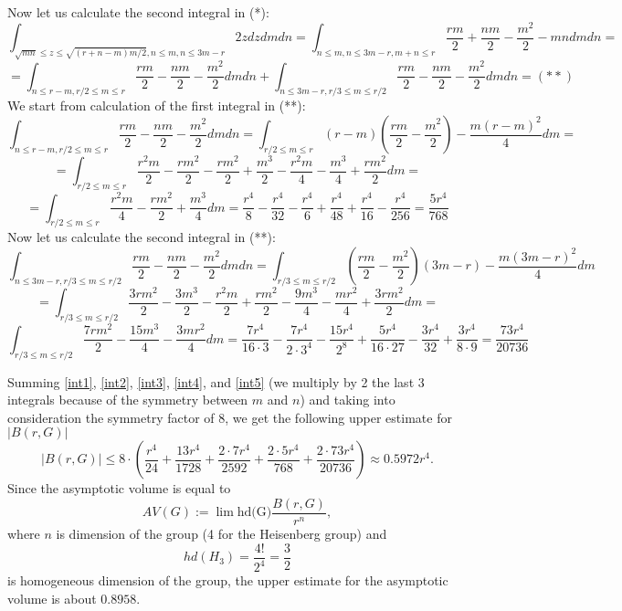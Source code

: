 \documentclass[11pt]{article}
\theoremstyle{Mystyle}
\begin{document}
Now let us calculate the second integral in (*):
$$\int_{\sqrt{mn}\leq z\leq \sqrt{(r+n-m)m/2}, n\leq m, n\leq 3m - r} 2z dz dm dn= 
\int_{n\leq m, n\leq 3m - r, m+n\leq r} \frac{rm}{2} + \frac{nm}{2} - \frac{m^2}{2} - mn dm dn=
$$
$$=\int_{n\leq r-m, r/2\leq m\leq r} \frac{rm}{2} - \frac{nm}{2} - \frac{m^2}{2} dm dn + 
\int_{n\leq 3m - r, r/3\leq m\leq r/2} \frac{rm}{2} - \frac{nm}{2}-\frac{m^2}{2} dm dn = (**)$$
We start from calculation of the first integral in (**):
$$\int_{n\leq r-m, r/2\leq m\leq r} \frac{rm}{2} - \frac{nm}{2} - \frac{m^2}{2} dm dn = 
\int_{r/2\leq m\leq r} (r-m)\left(\frac{rm}{2} - \frac{m^2}{2}\right) - \frac{m(r-m)^2}{4} dm=$$
$$=\int_{r/2\leq m\leq r} \frac{r^2m}{2} - \frac{rm^2}{2} - \frac{rm^2}{2} + \frac{m^3}{2} - \frac{r^2m}{4} - \frac{m^3}{4} + \frac{rm^2}{2} dm=$$
\begin{equation}
\label{int4}
=\int_{r/2\leq m\leq r} \frac{r^2m}{4} - \frac{rm^2}{2} + \frac{m^3}{4} dm = 
\frac{r^4}{8} - \frac{r^4}{32} - \frac{r^4}{6} + \frac{r^4}{48} + \frac{r^4}{16} - \frac{r^4}{256} = \frac{5r^4}{768}
\end{equation}
Now let us calculate the second integral in (**):
$$\int_{n\leq 3m - r, r/3\leq m\leq r/2} \frac{rm}{2} - \frac{nm}{2}-\frac{m^2}{2} dm dn
= \int_{r/3\leq m\leq r/2} \left(\frac{rm}{2} - \frac{m^2}{2}\right)(3m-r) - \frac{m(3m-r)^2}{4}dm$$
$$= \int_{r/3\leq m\leq r/2} \frac{3rm^2}{2} - \frac{3m^3}{2} - \frac{r^2m}{2} + \frac{rm^2}{2} - \frac{9m^3}{4} - \frac{mr^2}{4} + \frac{3rm^2}{2} dm =$$ 
\begin{equation}
\label{int5}
\int_{r/3\leq m\leq r/2} \frac{7rm^2}{2} - \frac{15m^3}{4} - \frac{3mr^2}{4} dm = \frac{7r^4}{16\cdot 3} - \frac{7r^4}{2\cdot 3^4} - \frac{15r^4}{2^8} + \frac{5r^4}{16\cdot 27} - \frac{3r^4}{32} + \frac{3r^4}{8\cdot 9} = \frac{73r^4}{20736}
\end{equation}

Summing \eqref{int1}, \eqref{int2}, \eqref{int3}, \eqref{int4}, and \eqref{int5} (we multiply by 2 the last 3 integrals because of the symmetry between $m$ and $n$)
and taking into consideration the symmetry factor of $8$,
 we get the following upper estimate for $|B(r,G)|$
$$|B(r,G)|\leq 8\cdot\left(\frac{r^4}{24} + \frac{13r^4}{1728} + \frac{2\cdot 7r^4}{2592} + \frac{2\cdot 5r^4}{768} + \frac{2\cdot 73r^4}{20736}\right) \approx 0.5972 r^4.
$$
Since the asymptotic volume is equal to
\begin{equation}
\label{AsVolDef}
AV(G):=\lim \mbox{hd(G)}\frac{B(r,G)}{r^{n}},
\end{equation}
where $n$ is dimension of the group (4 for the Heisenberg group) and
$$hd(H_{3}) = \frac{4!}{2^4} = \frac{3}{2}$$
is homogeneous dimension of the group,
the upper estimate for the asymptotic volume is about $0.8958$.
\end{document}
